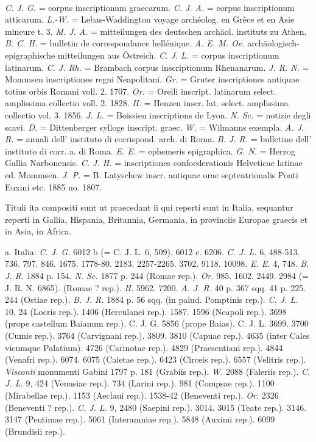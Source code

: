 \documentclass[a4paper, 11pt, oneside, polutonikogreek, german]{article}
\begin{document}
\paragraph{}
\emph{C. J. G.} = corpus inscriptionum graecarum. \emph{C. J. A.} = corpus inscriptionum atticarum. \emph{L.-W.} = Lebas-Waddington voyage archéolog. en Grèce et en Asie mineure t. 3. \emph{M. J. A.} = mitteilungen des deutschen archäol. instituts zu Athen. \emph{B. C. H.} = bulletin de correspondance hellénique. \emph{A. E. M. Oe.} archäologisch-epigraphische mitteilungen aus Östreich. \emph{C. J. L.} = corpus inscriptionum latinarum. \emph{C. J. Rh.} = Brambach corpus inscriptionum Rhenanarum. \emph{J. R. N.} = Mommsen inscriptiones regni Neapolitani. \emph{Gr.} = Gruter inscriptiones antiquae totius orbis Romani voll. 2. 1707. \emph{Or.} = Orelli inscript. latinarum select. amplissima collectio voll. 2. 1828. \emph{H.} = Henzen inscr. lat. select. amplissima collectio vol. 3. 1856. \emph{J. L.} = Boissieu inscriptions de Lyon. \emph{N. Sc.} = notizie degli scavi. \emph{D.} = Dittenberger sylloge inscript. graec. \emph{W.} = Wilmanns exempla. \emph{A. J. R.} = annali dell' instituto di corrispond. arch. di Roma. \emph{B. J. R.} = bulletino dell' instituto di corr. a. di Roma. \emph{E. E.} = ephemeris epigraphica. \emph{G. N.} = Herzog Gallia Narbonensis. \emph{C. J. H.} = inscriptiones confoederationis Helveticae latinae ed. Mommsen. \emph{J. P.} = B. Latyschew inscr. antiquae orae septentrionalis Ponti Euxini etc. 1885 no. 1807.

Tituli ita compositi sunt ut praecedant ii qui reperti sunt in Italia, sequantur reperti in Gallia, Hispania, Britannia, Germania, in provinciis Europae graecis et in Asia, in Africa.

a. Italia: \emph{C. J. G.} 6012 b (= C. J. L. 6, 509). 6012 c. 6206. \emph{C. J. L.} 6, 488-513. 736. 797. 846. 1675. 1778-80. 2183. 2257-2265. 3702. 9118. 10098. \emph{E. E.} 4, 748. \emph{B. J. R.} 1884 p. 154. \emph{N. Sc.} 1877 p. 244 (Romae rep.). \emph{Or.} 985. 1602. 2449. 2984 (= J. R. N. 6865). (Romae ? rep.). \emph{H.} 5962. 7200. \emph{A. J. R.} 40 p. 367 sqq. 41 p. 225. 244 (Ostiae rep.). \emph{B. J. R.} 1884 p. 56 sqq. (in palud. Pomptinis rep.). \emph{C. J. L.} 10, 24 (Locris rep.). 1406 (Herculanei rep.). 1587. 1596 (Neapoli rep.). 3698 (prope castellum Baianum rep.). C. J. G. 5856 (prope Baias). C. J. L. 3699. 3700 (Cumis rep.). 3764 (Carvignani rep.). 3809. 3810 (Capuae rep.). 4635 (inter Cales vicumque Palatium). 4726 (Carinotae rep.). 4829 (Praesentiani rep.). 4844 (Venafri rep.). 6074. 6075 (Caietae rep.). 6423 (Circeis rep.). 6557 (Velitris rep.). \emph{Visconti} monumenti Gabini 1797 p. 181 (Grabiis rep.). \emph{W.} 2088 (Faleriis rep.). \emph{C. J. L.} 9, 424 (Venusiae rep.). 734 (Larini rep.). 981 (Compsae rep.). 1100 (Mirabellae rep.). 1153 (Aeclaui rep.). 1538-42 (Beneventi rep.). \emph{Or.} 2326 (Beneventi ? rep.). \emph{C. J. L.} 9, 2480 (Saepini rep.). 3014. 3015 (Teate rep.). 3146. 3147 (Pentimae rep.). 5061 (Interamniae rep.). 5848 (Auximi rep.). 6099 (Brundisii rep.).
\end{document}
